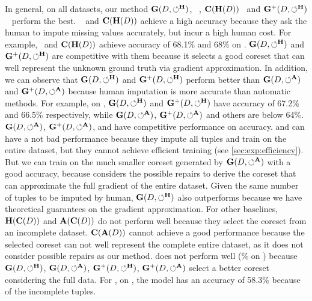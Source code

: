 In general, on all datasets, our method $\mathbf{G}(D,\circlearrowleft^\mathbf{H})$, \truth~, $\mathbf{C}(\mathbf{H}(D))$~ and $\mathbf{G}^+(D,\circlearrowleft^\mathbf{H})$~  perform the best. 
 \truth~ and $\mathbf{C}(\mathbf{H}(D))$ achieve a high accuracy because they ask the human to impute missing values accurately, but incur a high human cost.  For example, \truth~and $\mathbf{C}(\mathbf{H}(D))$ achieve accuracy of 68.1\% and 68\% on \imdbl. $\mathbf{G}(D,\circlearrowleft^\mathbf{H})$ and $\mathbf{G}^+(D,\circlearrowleft^\mathbf{H})$  are competitive with them because it selects a good coreset that can well represent the unknown ground truth via gradient approximation. In addition, we can observe that $\mathbf{G}(D,\circlearrowleft^\mathbf{H})$ and $\mathbf{G}^+(D,\circlearrowleft^\mathbf{H})$ perform better than $\mathbf{G}(D,\circlearrowleft^\mathbf{A})$ and $\mathbf{G}^+(D,\circlearrowleft^\mathbf{A})$ because human imputation is more accurate than automatic methods. For example, on \imdbl, $\mathbf{G}(D,\circlearrowleft^\mathbf{H})$ and $\mathbf{G}^+(D,\circlearrowleft^\mathbf{H})$ have accuracy of 67.2\% and 66.5\% respectively, while $\mathbf{G}(D,\circlearrowleft^\mathbf{A})$, $\mathbf{G}^+(D,\circlearrowleft^\mathbf{A})$ and others are below 64\%. $\mathbf{G}(D,\circlearrowleft^\mathbf{A})$, $\mathbf{G}^+(D,\circlearrowleft^\mathbf{A})$, \boostclean and \gain have competitive performance on accuracy. \boostclean and \gain can have a not bad performance because they impute all tuples and train on the entire dataset, but they cannot achieve efficient training (see \ref{sec:exp:efficiency}). But we can train on the much smaller coreset generated by $\mathbf{G}(D,\circlearrowleft^\mathbf{A})$ with a good accuracy, because \ours considers the possible repairs to derive the coreset  that can approximate the full gradient of the entire dataset. Given the same number of tuples to be imputed by human,  $\mathbf{G}(D,\circlearrowleft^\mathbf{H})$ also outperforms \actclean because we have theoretical guarantees on the gradient approximation. 
  For other baselines,  $\mathbf{H}(\mathbf{C}(D))$ and $\mathbf{A}(\mathbf{C}(D))$ do not perform well because they select the coreset from an incomplete dataset.  $\mathbf{C}(\mathbf{A}(D))$ cannot achieve a good performance because the selected coreset can not well represent the complete entire dataset, as it does not consider possible repairs as our method.  %
  {\mixcore} does not perform well (\% on \imdbl) because $\mathbf{G}(D,\circlearrowleft^\mathbf{H})$, $\mathbf{G}(D,\circlearrowleft^\mathbf{A})$, $\mathbf{G}^+(D,\circlearrowleft^\mathbf{H})$, $\mathbf{G}^+(D,\circlearrowleft^\mathbf{A})$ select a better coreset considering the full data. For \noclean, on  \imdbl, the model  has an accuracy of 58.3\% because of the incomplete tuples.



